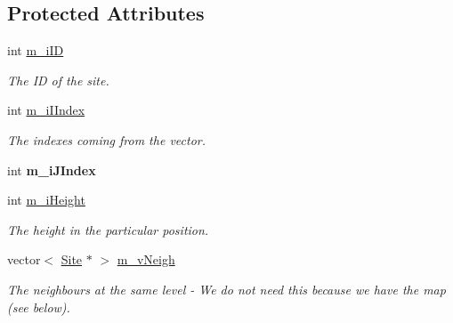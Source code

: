 \subsection*{Protected Attributes}
\begin{DoxyCompactItemize}
\item 
\mbox{\label{classSurfaceTiles_1_1Site_a2a37f8387a2ec601ceff59a3f4298430}} 
int \mbox{\hyperlink{classSurfaceTiles_1_1Site_a2a37f8387a2ec601ceff59a3f4298430}{m\+\_\+i\+ID}}
\begin{DoxyCompactList}\small\item\em The ID of the site. \end{DoxyCompactList}\item 
\mbox{\label{classSurfaceTiles_1_1Site_a5a9ff38d47c8a1b4d79c1a9e37eb523f}} 
int \mbox{\hyperlink{classSurfaceTiles_1_1Site_a5a9ff38d47c8a1b4d79c1a9e37eb523f}{m\+\_\+i\+I\+Index}}
\begin{DoxyCompactList}\small\item\em The indexes coming from the vector. \end{DoxyCompactList}\item 
\mbox{\label{classSurfaceTiles_1_1Site_aba60675f43b91ccde17ff0cbc3bdd470}} 
int {\bfseries m\+\_\+i\+J\+Index}
\item 
\mbox{\label{classSurfaceTiles_1_1Site_a82f53bedd3340662d07ab36766c0749e}} 
int \mbox{\hyperlink{classSurfaceTiles_1_1Site_a82f53bedd3340662d07ab36766c0749e}{m\+\_\+i\+Height}}
\begin{DoxyCompactList}\small\item\em The height in the particular position. \end{DoxyCompactList}\item 
\mbox{\label{classSurfaceTiles_1_1Site_ac37d85470aff64d634bb015e9bad6a34}} 
vector$<$ \mbox{\hyperlink{classSurfaceTiles_1_1Site}{Site}} $\ast$ $>$ \mbox{\hyperlink{classSurfaceTiles_1_1Site_ac37d85470aff64d634bb015e9bad6a34}{m\+\_\+v\+Neigh}}
\begin{DoxyCompactList}\small\item\em The neighbours at the same level -\/ We do not need this because we have the map (see below). \end{DoxyCompactList}\item 

\end{DoxyCompactItemize}
